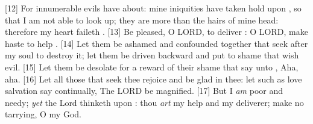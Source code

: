 [12] \textcolor[cmyk]{0.99998,1,0,0}{For innumerable evils have   about: mine iniquities have taken hold upon , so that I am not able to look up; they are more than the hairs of mine head: therefore my heart faileth .}
[13] \textcolor[cmyk]{0.99998,1,0,0}{Be pleased, O LORD, to deliver : O LORD, make haste to help .}
[14] \textcolor[cmyk]{0.99998,1,0,0}{Let them be ashamed and confounded together that seek after my soul to destroy it; let them be driven backward and put to shame that wish  evil.}
[15] \textcolor[cmyk]{0.99998,1,0,0}{Let them be desolate for a reward of their shame that say unto , Aha, aha.}
[16] \textcolor[cmyk]{0.99998,1,0,0}{Let all those that seek thee rejoice and be glad in thee: let such as love  salvation say continually, The LORD be magnified.}
[17] \textcolor[cmyk]{0.99998,1,0,0}{But I \emph{am} poor and needy; \emph{yet} the Lord thinketh upon : thou \emph{art} my help and my deliverer; make no tarrying, O my God.}



